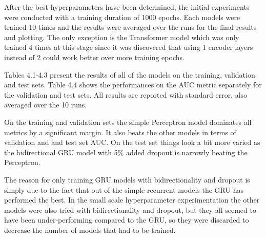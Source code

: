 \documentclass[bsc,frontabs,singlespacing,parskip,deptreport]{infthesis}
\begin{document}
After the best hyperparameters have been determined, the initial experiments were conducted with a training duration of 1000 epochs. Each models were trained 10 times and the results were averaged over the runs for the final results and plotting. The only exception is the Transformer model which was only trained 4 times at this stage since it was discovered that using 1 encoder layers instead of 2 could work better over more training epochs.

Tables 4.1-4.3 present the results of all of the models on the training, validation and test sets. Table 4.4 shows the performances on the AUC metric separately for the validation and test sets. All results are reported with standard error, also averaged over the 10 runs.

On the training and validation sets the simple Perceptron model dominates all metrics by a significant margin. It also beats the other models in terms of validation and and test set AUC. On the test set things look a bit more varied as the bidirectional GRU model with 5\% added dropout is narrowly beating the Perceptron.

The reason for only training GRU models with bidirectionality and dropout is simply due to the fact that out of the simple recurrent models the GRU has performed the best. In the small scale hyperparameter experimentation the other models were also tried with bidirectionality and dropout, but they all seemed to have been under-performing compared to the GRU, so they were discarded to decrease the number of models that had to be trained.
\end{document}
